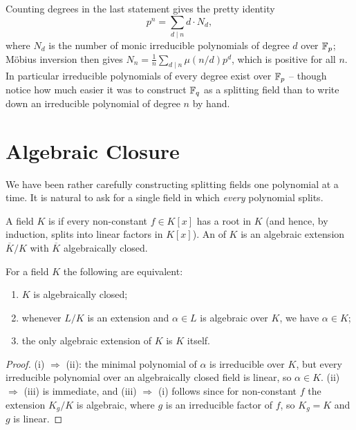 \documentclass[a4paper]{scrartcl}
\begin{document}
Counting degrees in the last statement gives the pretty identity
$$p^n = \sum_{d \mid n} d \cdot N_d,$$
where $N_d$ is the number of monic irreducible polynomials of degree $d$ over $\mathbb{F}_p$; M\"obius inversion then gives $N_n = \frac{1}{n}\sum_{d\mid n}\mu(n/d)p^d$, which is positive for all $n$. In particular irreducible polynomials of every degree exist over $\mathbb{F}_p$ -- though notice how much easier it was to construct $\mathbb{F}_q$ as a splitting field than to write down an irreducible polynomial of degree $n$ by hand.

\section{Algebraic Closure}

We have been rather carefully constructing splitting fields one polynomial at a time. It is natural to ask for a single field in which \emph{every} polynomial splits.

\begin{definition}
	A field $K$ is  if every non-constant $f \in K[x]$ has a root in $K$ (and hence, by induction, splits into linear factors in $K[x]$). An  of $K$ is an algebraic extension $\overline K/K$ with $\overline K$ algebraically closed.
\end{definition}

\begin{lemma}
	For a field $K$ the following are equivalent:
	\begin{enumerate}[label=(\roman*)]
		\item $K$ is algebraically closed;
		\item whenever $L/K$ is an extension and $\alpha \in L$ is algebraic over $K$, we have $\alpha \in K$;
		\item the only algebraic extension of $K$ is $K$ itself.
	\end{enumerate}
\end{lemma}

\begin{proof}
	(i) $\Rightarrow$ (ii): the minimal polynomial of $\alpha$ is irreducible over $K$, but every irreducible polynomial over an algebraically closed field is linear, so $\alpha \in K$. (ii) $\Rightarrow$ (iii) is immediate, and (iii) $\Rightarrow$ (i) follows since for non-constant $f$ the extension $K_g/K$ is algebraic, where $g$ is an irreducible factor of $f$, so $K_g = K$ and $g$ is linear.
\end{proof}
\end{document}

